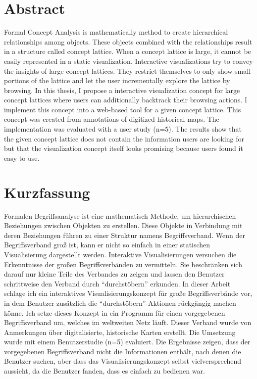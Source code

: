 \documentclass[11pt]{report}
\begin{document}


\renewcommand{\thepage}{\roman{page}}%

\newpage
\thispagestyle{empty}
\mbox{}

\chapter*{Abstract}
Formal Concept Analysis is mathematically method to create hierarchical relationships among objects. These objects combined with the relationships result in a structure called concept lattice. When a concept lattice is large, it cannot be easily represented in a static visualization. Interactive visualizations try to convey the insights of large concept lattices. They restrict themselves to only show small portions of the lattice and let the user incrementally explore the lattice by browsing. In this thesis, I propose a interactive visualization concept for large concept lattices where users can additionally backtrack their browsing actions. I implement this concept into a web-based tool for a given concept lattice. This concept was created from annotations of digitized historical maps. The implementation was evaluated with a user study (n=5). The results show that the given concept lattice does not contain the information users are looking for but that the visualization concept itself looks promising because users found it easy to use.

\newpage
\thispagestyle{empty}
\mbox{}

\chapter*{Kurzfassung}

Formalen Begriffsanalyse ist eine mathematisch Methode, um hierarchischen Beziehungen zwischen Objekten zu erstellen. Diese Objekte in Verbindung mit deren Beziehungen führen zu einer Struktur namens Begriffsverband. Wenn der Begriffsverband groß ist, kann er nicht so einfach in einer statischen Visualisierung dargestellt werden. Interaktive Visualisierungen versuchen die Erkenntnisse der großen Begriffsverbänden zu vermitteln. Sie beschränken sich darauf nur kleine Teile des Verbandes zu zeigen und lassen den Benutzer schrittweise den Verband durch ``durchstöbern'' erkunden. In dieser Arbeit schlage ich ein interaktives Visualisierungskonzept für große Begriffsverbände vor, in dem Benutzer zusätzlich die ``durchstöbern''-Aktionen rückgängig machen könne. Ich setze dieses Konzept in ein Programm für einen vorgegebenen Begriffsverband um, welches im weltweiten Netz läuft. Dieser Verband wurde von Anmerkungen über digitalisierte, historische Karten erstellt. Die Umsetzung wurde mit einem Benutzerstudie (n=5) evaluiert. Die Ergebnisse zeigen, dass der vorgegebenen Begriffsverband nicht die Informationen enthält, nach denen die Benutzer suchen, aber dass das Visualisierungskonzept selbst vielversprechend aussieht, da die Benutzer fanden, dass es einfach zu bedienen war.
\end{document}

